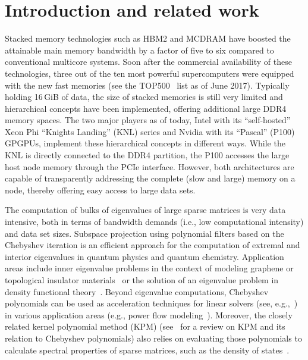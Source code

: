 \documentclass[letterpaper]{llncs}
\newcommand{\GiB}{\mbox{GiB}\xspace}
\begin{document}
\section{Introduction and related work}
Stacked memory technologies such as HBM2 and MCDRAM have boosted the attainable main memory bandwidth by a factor of five to six compared to conventional multicore  systems. Soon after the commercial availability of these technologies, three out of the ten most powerful supercomputers were equipped with the new fast memories (see the TOP500~\cite{TOP500} list as of June 2017). Typically holding 16\,\GiB of data, the size of stacked memories is still very limited and hierarchical concepts have been implemented, offering additional large DDR4 memory spaces.  The two major players as of today, Intel with its ``self-hosted'' Xeon Phi ``Knights Landing'' (KNL) series and Nvidia with its ``Pascal'' (P100) GPGPUs, implement these hierarchical concepts in different ways. While the KNL is directly connected to the DDR4 partition, the P100 accesses the large host node memory through the PCIe interface. However, both architectures are capable of transparently addressing the complete (slow and large) memory on a node, thereby offering easy access to large data sets.

The computation of bulks of eigenvalues of large sparse matrices is very data intensive, both in terms of bandwidth demands (i.e., low computational intensity) and data set sizes. Subspace projection using polynomial filters based on the Chebyshev iteration is an efficient approach for the computation of extremal and interior eigenvalues in quantum physics and quantum chemistry. Application areas include inner eigenvalue problems in the context of modeling graphene or topological insulator materials~\cite{SF12,SFFV12} or the solution of an eigenvalue problem in density functional theory~\cite{ZHOU2006172}. Beyond eigenvalue computations, Chebyshev polynomials can be used as acceleration techniques for linear solvers (see, e.g.,~\cite{Saad84,BASERMANN1997}) in various application areas (e.g., power flow modeling~\cite{Kamiabad2013,LI201487,LiLi2016}). Moreover, the closely related kernel polynomial method (KPM) (see~\cite{KPMRMP} for a review on KPM and its relation to Chebyshev polynomials) also relies on evaluating those polynomials to calculate spectral properties of sparse matrices, such as the density of states~\cite{BIBC13,Di_Napoli2016:838}.
\end{document}
